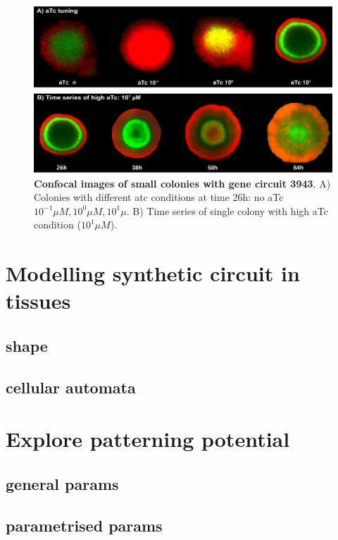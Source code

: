 \begin{figure}[H]

    \includegraphics[width=1\textwidth]{chapters/Chapter 3/atcwalk_timeseries_confocal}
    \caption{\textbf{Confocal images of small colonies with gene circuit 3943}. A) Colonies with different atc conditions at time 26h: no aTc $10^{-1} \mu M,10^{0} \mu M,10^{1} \mu  $. B) Time series of single colony with high aTc condition ($10^1 \mu M$).}
    \label{atcwalk_timeseries_confocal}
\end{figure}




\section{Modelling synthetic circuit in tissues}

\subsection{shape}
\subsection{cellular automata}
\section{Explore patterning potential}
\subsection{general params}
\subsection{parametrised params}




